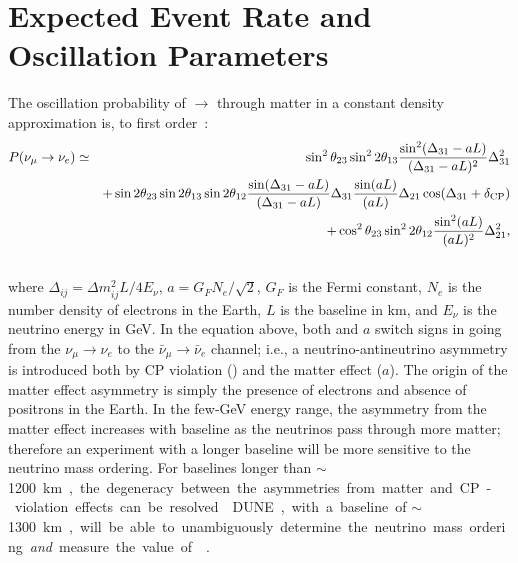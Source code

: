 \section{Expected Event Rate and Oscillation Parameters}
\label{sec:physics-lbnosc-osc}


The oscillation probability of \numu $\rightarrow$ \nue through matter in a constant density
approximation is,  %
to first order~\cite{Nunokawa:2007qh}:
%
\begin{eqnarray}
P(\nu_\mu \rightarrow \nu_e) & \simeq & \sin^2 \theta_{23} \sin^2 2 \theta_{13} 
\frac{ \sin^2(\Delta_{31} - aL)}{(\Delta_{31}-aL)^2} \Delta_{31}^2\\ \nonumber
& & + \sin 2 \theta_{23} \sin 2 \theta_{13} \sin 2 \theta_{12} \frac{ \sin(\Delta_{31} - aL)}{(\Delta_{31}-aL)} \Delta_{31} \frac{\sin(aL)}{(aL)} \Delta_{21} \cos (\Delta_{31} + \delta_{\rm CP})\\ \nonumber
& & + \cos^2 \theta_{23} \sin^2 2 \theta_{12} \frac {\sin^2(aL)}{(aL)^2} \Delta_{21}^2, \\ \nonumber
\label{eqn:appprob}
\end{eqnarray}
where $\Delta_{ij} = \Delta m^2_{ij} L/4E_\nu$, $a = G_FN_e/\sqrt{2}$, $G_F$ is the Fermi constant, $N_e$ is the number density of electrons in the Earth, $L$ is the baseline in km, and $E_\nu$ is the neutrino energy in GeV. 
In the equation above, both \deltacp and $a$ 
switch signs in going from the
$\nu_\mu \to \nu_e$ to the $\bar{\nu}_\mu \to \bar{\nu}_e$ channel; i.e.,
a neutrino-antineutrino asymmetry is introduced both by CP violation (\deltacp)
and the matter effect ($a$). The origin of the matter effect asymmetry 
is simply the presence of electrons and absence of positrons in the Earth.  
In the few-GeV energy range, the asymmetry from the matter effect increases with baseline as the neutrinos
pass through more matter; therefore an experiment with a longer baseline will be
more sensitive to the neutrino mass ordering. For baselines longer than 
$\sim$\SI{1200}\km, the degeneracy between the asymmetries from matter
and CP-violation effects can be resolved~\cite{Bass:2013vcg}. DUNE, with a baseline of $\sim$\SI{1300}\km, 
will be able to unambiguously
determine the neutrino mass ordering \textit{and} measure the value of \deltacp~\cite{Diwan:2004bt}. 

